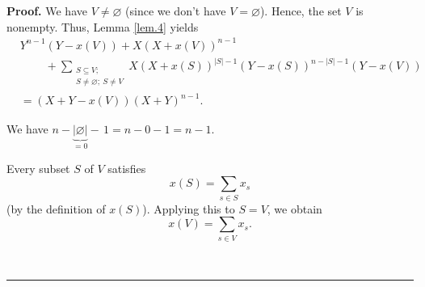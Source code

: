 \documentclass[numbers=enddot,12pt,final,onecolumn,notitlepage]{scrartcl}%
\theoremstyle{definition}
\newenvironment{proof}[1][Proof]{\noindent\textbf{#1.} }{\ \rule{0.5em}{0.5em}}
\let\sumnonlimits\sum
\renewcommand{\sum}{\sumnonlimits\limits}
\newenvironment{verlong}{}{}
\begin{document}
\begin{verlong}
\begin{proof}
We have $V\neq\varnothing$ (since we don't have $V=\varnothing$). Hence, the
set $V$ is nonempty. Thus, Lemma \ref{lem.4} yields%
\begin{align}
&  Y^{n-1}\left(  Y-x\left(  V\right)  \right)  +X\left(  X+x\left(  V\right)
\right)  ^{n-1}\nonumber\\
&  \ \ \ \ \ \ \ \ \ \ +\sum_{\substack{S\subseteq V;\\S\neq\varnothing
;\ S\neq V}}X\left(  X+x\left(  S\right)  \right)  ^{\left\vert S\right\vert
-1}\left(  Y-x\left(  S\right)  \right)  ^{n-\left\vert S\right\vert
-1}\left(  Y-x\left(  V\right)  \right) \nonumber\\
&  =\left(  X+Y-x\left(  V\right)  \right)  \left(  X+Y\right)  ^{n-1}.
\label{pf.thm.4.1}%
\end{align}


We have $n-\underbrace{\left\vert \varnothing\right\vert }_{=0}-\,1=n-0-1=n-1$.

Every subset $S$ of $V$ satisfies%
\begin{equation}
x\left(  S\right)  =\sum_{s\in S}x_{s} \label{pf.thm.4.2}%
\end{equation}
(by the definition of $x\left(  S\right)  $). Applying this to $S=V$, we
obtain%
\begin{equation}
x\left(  V\right)  =\sum_{s\in V}x_{s}. \label{pf.thm.4.3}%
\end{equation}



\end{proof}
\end{verlong}
\end{document}
